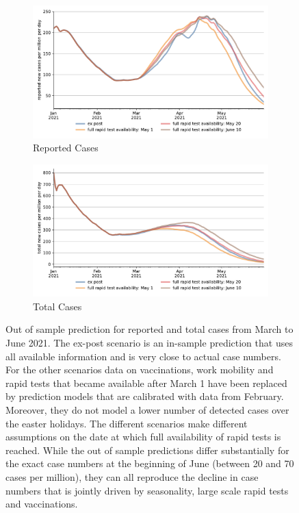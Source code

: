 \begin{figure}[ht] %
  \centering
  \begin{subfigure}[b]{.49\textwidth}
    \centering
    \includegraphics[width=0.9 \textwidth]{figures/results/figures/scenario_comparisons/robustness_check/full_new_known_case}
    \caption{Reported Cases}
    \label{fig:robustness_check_new_known_case}
  \end{subfigure}%
  \hfill
  \begin{subfigure}[b]{.49\textwidth}
    \centering
    \includegraphics[width=0.9 \textwidth]{figures/results/figures/scenario_comparisons/robustness_check/full_newly_infected}
    \caption{Total Cases}
    \label{fig:robustness_check_newly_infected}
  \end{subfigure}
  \caption{Out of sample prediction for reported and total cases from March to June
    2021. The ex-post scenario is an in-sample prediction that uses all available
    information and is very close to actual case numbers. For the other scenarios data
    on vaccinations, work mobility and rapid tests that became available after March 1
    have been replaced by prediction models that are calibrated with data from February.
    Moreover, they do not model a lower number of detected cases over the easter
    holidays. The different scenarios make different assumptions on the date at which
    full availability of rapid tests is reached. While the out of sample predictions
    differ substantially for the exact case numbers at the beginning of June (between
    20 and 70 cases per million), they can all reproduce the decline in case numbers
    that is jointly driven by seasonality, large scale rapid tests and vaccinations.
  }
  \label{fig:robustness_check_detailed}
\end{figure}

